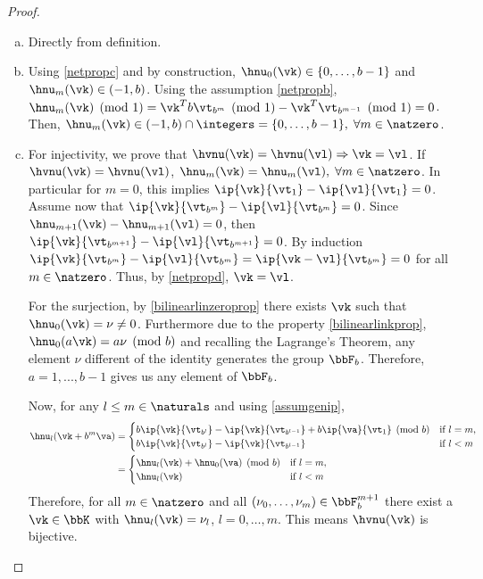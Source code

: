 \documentclass[]{elsarticle}
\theoremstyle{definition}
\begin{document}
\begin{proof}
\begin{enumerate}[a)]
\item Directly from definition.
\item Using \eqref{netpropc} and by construction, $\hnu_0(\vk)\in\{0,\dots,b-1\}$ and $\hnu_m(\vk)\in (-1,b)$. Using the assumption \eqref{netpropb}, $\hnu_m(\vk)\pmod 1=\vk^Tb\vt_{b^m}\pmod 1-\vk^T\vt_{b^{m-1}}\pmod 1=0$. Then, $\hnu_m(\vk)\in (-1,b)\cap\integers=\{0,\dots,b-1\},\;\forall m\in\natzero$.

\item For injectivity, we prove that $\hvnu(\vk)=\hvnu(\vl) \Rightarrow \vk = \vl$. If $\hvnu(\vk)=\hvnu(\vl)$, $\hnu_m(\vk)=\hnu_m(\vl),\;\forall m\in\natzero$. In particular for $m=0$, this implies $\ip{\vk}{\vt_1}-\ip{\vl}{\vt_1}=0$. Assume now that $\ip{\vk}{\vt_{b^m}}-\ip{\vl}{\vt_{b^m}}=0$. Since $\hnu_{m+1}(\vk)-\hnu_{m+1}(\vl)=0$, then $\ip{\vk}{\vt_{b^{m+1}}}-\ip{\vl}{\vt_{b^{m+1}}}=0$. By induction $\ip{\vk}{\vt_{b^{m}}}-\ip{\vl}{\vt_{b^{m}}}=\ip{\vk-\vl}{\vt_{b^{m}}}=0$ for all $m\in\natzero$. Thus, by \eqref{netpropd}, $\vk=\vl$.

\vspace{2mm}
    For the surjection, by \eqref{bilinearlinzeroprop} there exists $\vk$ such that $\hnu_0(\vk)=\nu\neq 0$. Furthermore due to the property \eqref{bilinearlinkprop}, $\hnu_0(a\vk)=a\nu \pmod b$ and recalling the Lagrange's Theorem, any element $\nu$ different of the identity generates the group $\bbF_b$. Therefore, $a=1,...,b-1$ gives us any element of $\bbF_b$.

    Now, for any $l\leq m\in\naturals$ and using \eqref{assumgenip},
\begin{align*}
\hnu_l(\vk+b^m\va)&=
\begin{cases}
b\ip{\vk}{\vt_{b^l}}-\ip{\vk}{\vt_{b^{l-1}}}+b\ip{\va}{\vt_{1}} \pmod b  &\mbox{if } l=m, \\
b\ip{\vk}{\vt_{b^l}}-\ip{\vk}{\vt_{b^{l-1}}} &\mbox{if } l<m   \end{cases}\\
&=
\begin{cases}
\hnu_l(\vk)+\hnu_0(\va) \pmod b  &\mbox{if } l=m, \\
\hnu_l(\vk) &\mbox{if } l<m   \end{cases}\\
\end{align*}
Therefore, for all $m\in \natzero$ and all $(\nu_0,\dots,\nu_m) \in \bbF_b^{m+1}$ there exist a $\vk \in \bbK$ with $\hnu_l(\vk)=\nu_l$, $l=0,\dots,m$. This means $\hvnu(\vk)$ is bijective.


\end{enumerate}
\end{proof}
\end{document}
